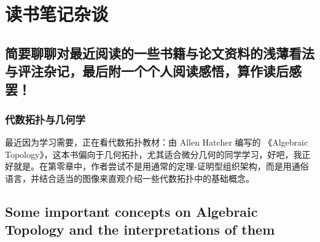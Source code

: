 \chapter{读书笔记杂谈}
\section{简要聊聊对最近阅读的一些书籍与论文资料的浅薄看法与评注杂记，最后附一个个人阅读感悟，算作读后感罢！}
\subsection{代数拓扑与几何学}
最近因为学习需要，正在看代数拓扑教材：由 Allen Hatcher 编写的 《Algebraic Topology》，这本书偏向于几何拓扑，尤其适合微分几何的同学学习，好吧，我正好就是。在第零章中，作者尝试不是用通常的定理-证明型组织架构，而是用通俗语言，并结合适当的图像来直观介绍一些代数拓扑中的基础概念。

\section{Some important concepts on Algebraic Topology and the interpretations of them}






